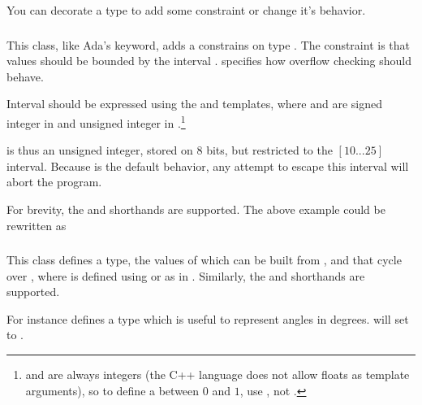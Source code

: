 You can decorate a type to add some constraint or change it's
behavior.

\subsubsection{}

This class, like Ada's  keyword, adds a constrains on type
.  The constraint is that values should be bounded by
the interval .   specifies how overflow
checking should behave.

Interval should be expressed using the  and
 templates, where  and  are
signed integer in  and unsigned integer in
.\footnote{%
   and  are always integers (the C++ language does
not allow floats as template arguments), so to define a 
between $0$ and $1$, use , not
. }%


 is thus an unsigned integer,
stored on 8 bits, but restricted to the $[10...25]$ interval.  Because
 is the default behavior, any attempt to escape this
interval will abort the program.

For brevity, the  and  shorthands are
supported.  The above example could be rewritten as


\subsubsection{}

This class defines a type, the values of which can be built from
, and that cycle over , where  is
defined using  or 
as in .  Similarly, the  and 
shorthands are supported.

For instance  defines a type
which is useful to represent angles in degrees.  
will set  to .

